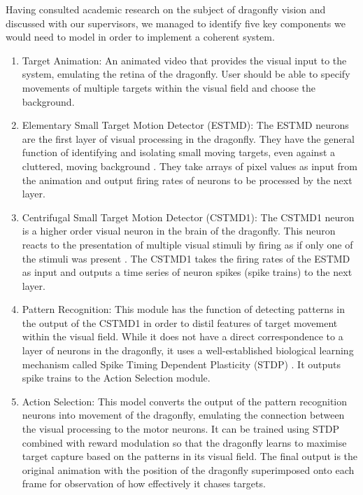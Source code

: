 \documentclass[a4paper,11pt]{article}
\begin{document}
Having consulted academic research on the subject of dragonfly vision and discussed with our supervisors, we managed to identify five key components we would need to model in order to implement a coherent system. 

\begin{enumerate}
\item{Target Animation:} An animated video that provides the visual input to the system, emulating the retina of the dragonfly. User should be able to specify movements of multiple targets within the visual field and choose the background.
\item{Elementary Small Target Motion Detector (ESTMD):} The ESTMD neurons are the first layer of visual processing in the dragonfly. They have the general function of identifying and isolating small moving targets, even against a cluttered, moving background \cite{Wiederman2008}. They take arrays of pixel values as input from the animation and output firing rates of neurons to be processed by the next layer.
\item{Centrifugal Small Target Motion Detector (CSTMD1):} The CSTMD1 neuron is a higher order visual neuron in the brain of the dragonfly. This neuron reacts to the presentation of multiple visual stimuli by firing as if only one of the stimuli was present \cite{w13}. The CSTMD1 takes the firing rates of the ESTMD as input and outputs a time series of neuron spikes (spike trains) to the next layer.
\item{Pattern Recognition:} This module has the function of detecting patterns in the output of the CSTMD1 in order to distil features of target movement within the visual field. While it does not have a direct correspondence to a layer of neurons in the dragonfly, it uses a well-established biological learning mechanism called Spike Timing Dependent Plasticity (STDP) \cite{stdp1}\cite{stdp2}. It outputs spike trains to the Action Selection module.
\item{Action Selection:} This model converts the output of the pattern recognition neurons into movement of the dragonfly, emulating the connection between the visual processing to the motor neurons. It can be trained using STDP combined with reward modulation so that the dragonfly learns to maximise target capture based on the patterns in its visual field. The final output is the original animation with the position of the dragonfly superimposed onto each frame for observation of how effectively it chases targets.
\end{enumerate}
\end{document}
